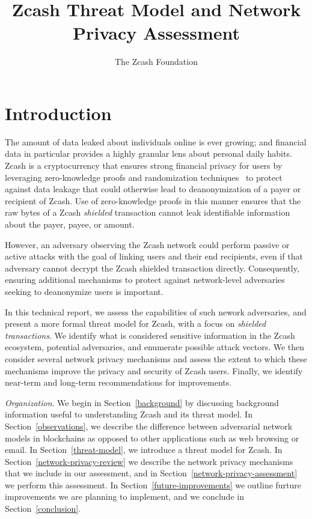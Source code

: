 \documentclass{article}
\title{Zcash Threat Model and Network Privacy Assessment}
\author{The Zcash Foundation}
\begin{document}
    \maketitle
\section{Introduction}

The amount of data leaked about individuals online is ever growing; and
financial data in particular
provides a highly granular lens about personal daily habits.
Zcash is a cryptocurrency that ensures strong financial
privacy for users by leveraging zero-knowledge proofs and randomization
techniques~\cite{zcash-spec} to
protect against data leakage that could otherwise lead to deanonymization of a
payer or
recipient of Zcash. Use of zero-knowledge proofs in this manner ensures that
the raw bytes of a Zcash \emph{shielded} transaction cannot leak identifiable
information about the payer, payee, or amount.

However, an adversary observing the Zcash network
could perform passive or active attacks with the goal of linking
users and their end recipients, even if that adversary cannot decrypt the Zcash
shielded transaction directly. Consequently, ensuring additional mechanisms to
protect against network-level adversaries seeking to deanonymize users is
important.

In this technical report, we assess the capabilities of such nework
adversaries, and present a more formal threat model for Zcash, with a focus on
\textit{shielded
transactions}. We identify what is considered sensitive information in the Zcash
ecosystem, potential adversaries, and enumerate possible attack vectors.
We then consider several
network privacy mechanisms and assess the extent to which these
mechanisms improve the privacy and security of Zcash users. Finally, we
identify near-term and long-term recommendations for improvements.

\textit{Organization}.
We begin in Section~\ref{background} by discussing background information
useful to understanding Zcash and its threat model. In
Section~\ref{observations}, we describe the difference between adversarial
network models in blockchains as opposed to other applications such as web
browsing or email. In
Section~\ref{threat-model}, we introduce a threat model for Zcash.
In Section~\ref{network-privacy-review} we describe the network
privacy mechanisms that we include in our assessment, and in
Section~\ref{network-privacy-assessment} we perform this assessment.
In Section~\ref{future-improvements} we outline furture improvements we are
planning to implement, and we conclude in Section~\ref{conclusion}.
\end{document}
